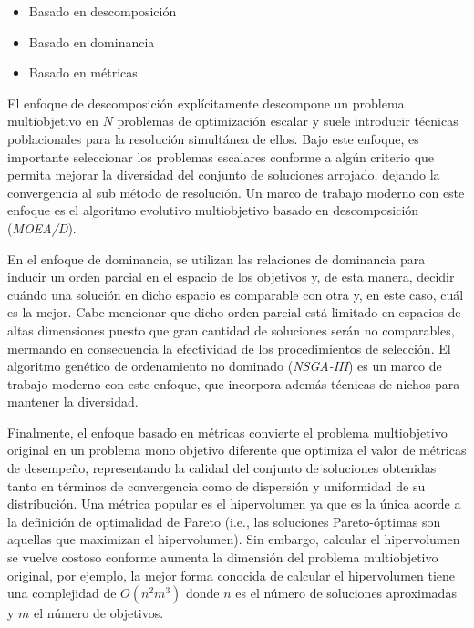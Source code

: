 \documentclass[letterpaper,10pt]{article}
\begin{document}
\begin{itemize}
 \item Basado en descomposición
 \item Basado en dominancia
 \item Basado en métricas
\end{itemize}

El enfoque de descomposición explícitamente descompone un problema multiobjetivo en $N$ problemas de optimización escalar y suele introducir técnicas poblacionales para
la resolución simultánea de ellos. Bajo este enfoque, es importante seleccionar los problemas escalares conforme a algún criterio que permita mejorar la diversidad del conjunto
de soluciones arrojado, dejando la convergencia al sub método de resolución. Un marco de trabajo moderno con este enfoque es el algoritmo evolutivo multiobjetivo basado en
descomposición (\emph{MOEA/D})\cite{4358754}.
\newline

En el enfoque de dominancia, se utilizan las relaciones de dominancia para inducir un orden parcial en el espacio de los objetivos y, de esta manera, decidir cuándo una solución
en dicho espacio es comparable con otra y, en este caso, cuál es la mejor. Cabe mencionar que dicho orden parcial está limitado en espacios de altas dimensiones puesto que gran
cantidad de soluciones serán no comparables, mermando en consecuencia la efectividad de los procedimientos de selección. El algoritmo genético de ordenamiento no dominado
(\emph{NSGA-III})\cite{6600851} es un marco de trabajo moderno con este enfoque, que incorpora además técnicas de nichos para mantener la diversidad.
\newline

Finalmente, el enfoque basado en métricas convierte el problema multiobjetivo original en un problema mono objetivo diferente que optimiza el valor de métricas de desempeño,
representando la calidad del conjunto de soluciones obtenidas tanto en términos de convergencia como de dispersión y uniformidad de su distribución. Una métrica popular
es el hipervolumen ya que es la única acorde a la definición de  optimalidad de Pareto (i.e., las soluciones Pareto-óptimas son aquellas que maximizan el hipervolumen).
Sin embargo, calcular el hipervolumen se vuelve costoso conforme aumenta la dimensión del problema multiobjetivo original, por ejemplo, la mejor forma conocida de calcular
el hipervolumen tiene una complejidad de $O(n^2m^3)$ donde $n$ es el número de soluciones aproximadas y $m$ el número de objetivos.
\newline
\end{document}
